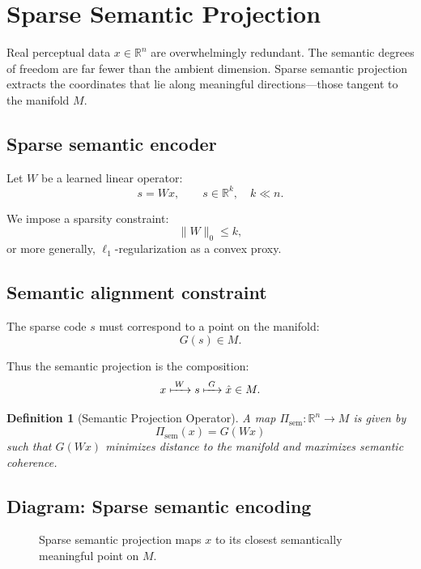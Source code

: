 \documentclass[11pt,a4paper,twocolumn]{article}
\newtheorem{definition}[theorem]{Definition}
\begin{document}
\section{Sparse Semantic Projection}

Real perceptual data $x \in \mathbb{R}^n$ are overwhelmingly redundant.
The semantic degrees of freedom are far fewer than the ambient dimension.
Sparse semantic projection extracts the coordinates that lie along
meaningful directions—those tangent to the manifold $M$.

\subsection{Sparse semantic encoder}

Let $W$ be a learned linear operator:
\[
s = W x, \qquad s \in \mathbb{R}^k, \quad k \ll n.
\]

We impose a sparsity constraint:
\[
\|W\|_0 \le k,
\]
or more generally, $\ell_1$-regularization as a convex proxy.

\subsection{Semantic alignment constraint}

The sparse code $s$ must correspond to a point on the manifold:
\[
G(s) \in M.
\]

Thus the semantic projection is the composition:
\[
x \xmapsto{\;W\;} s \xmapsto{\;G\;} \hat{x} \in M.
\]

\begin{definition}[Semantic Projection Operator]
A map $\Pi_{\mathrm{sem}} : \mathbb{R}^n \to M$ is given by
\[
\Pi_{\mathrm{sem}}(x) = G(Wx)
\]
such that $G(Wx)$ minimizes distance to the manifold and maximizes
semantic coherence.
\end{definition}

\subsection{Diagram: Sparse semantic encoding}

\begin{figure}[H]
\centering
{}
\caption{Sparse semantic projection maps $x$ to its closest semantically meaningful point on $M$.}
\end{figure}
\end{document}
